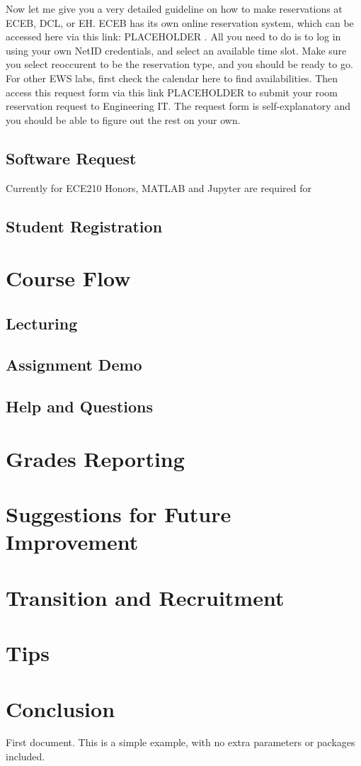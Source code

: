 \documentclass[12pt]{article}
\begin{document}
        Now let me give you a very detailed guideline on how to make reservations at ECEB, DCL, or EH. ECEB has its own online reservation system, which can be accessed here via this link: PLACEHOLDER . All you need to do is to log in using your own NetID credentials, and select an available time slot. Make sure you select reoccurent to be the reservation type, and you should be ready to go. For other EWS labs, first check the calendar here to find availabilities. Then access this request form via this link PLACEHOLDER to submit your room reservation request to Engineering IT. The request form is self-explanatory and you should be able to figure out the rest on your own.
    \subsection{Software Request}
        Currently for ECE210 Honors, MATLAB and Jupyter are required for 
    \subsection{Student Registration}
\newpage

\section{Course Flow}
    \subsection{Lecturing}
    \subsection{Assignment Demo}
    \subsection{Help and Questions}
\newpage

\section{Grades Reporting}
    
\newpage

\section{Suggestions for Future Improvement}

\newpage

\section{Transition and Recruitment}
\newpage

\section{Tips}


\newpage

\section{Conclusion}



   First document. This is a simple example, with no 
   extra parameters or packages included.
\end{document}
